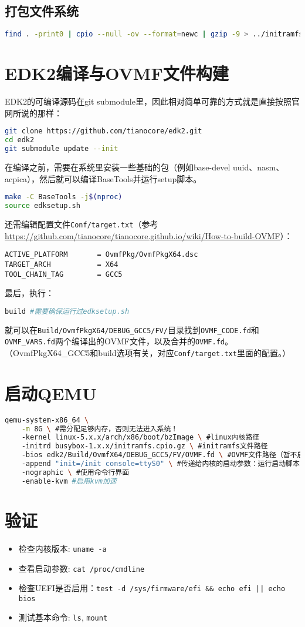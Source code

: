 \subsection{打包文件系统}
\begin{lstlisting}[language=bash]
find . -print0 | cpio --null -ov --format=newc | gzip -9 > ../initramfs.cpio.gz
\end{lstlisting}

\section{EDK2编译与OVMF文件构建}
EDK2的可编译源码在git submodule里，因此相对简单可靠的方式就是直接按照官网所说的那样：
\begin{lstlisting}[language=bash]
git clone https://github.com/tianocore/edk2.git
cd edk2
git submodule update --init
\end{lstlisting}
在编译之前，需要在系统里安装一些基础的包（例如base-devel uuid、nasm、acpica），然后就可以编译BaseTools并运行setup脚本。
\begin{lstlisting}[language=bash]
make -C BaseTools -j$(nproc)
source edksetup.sh
\end{lstlisting}
还需编辑配置文件\texttt{Conf/target.txt}（参考\url{https://github.com/tianocore/tianocore.github.io/wiki/How-to-build-OVMF}）：
\begin{lstlisting}
ACTIVE_PLATFORM       = OvmfPkg/OvmfPkgX64.dsc
TARGET_ARCH           = X64
TOOL_CHAIN_TAG        = GCC5
\end{lstlisting}
最后，执行：
\begin{lstlisting}[language=bash]
build #需要确保运行过edksetup.sh
\end{lstlisting}
就可以在\texttt{Build/OvmfPkgX64/DEBUG\_GCC5/FV/}目录找到\texttt{OVMF\_CODE.fd}和\texttt{OVMF\_VARS.fd}两个编译出的OVMF文件，以及合并的\texttt{OVMF.fd}。（OvmfPkgX64\_GCC5和build选项有关，对应\texttt{Conf/target.txt}里面的配置。）

\section{启动QEMU}
\begin{lstlisting}[language=bash]
qemu-system-x86_64 \
    -m 8G \ #需分配足够内存，否则无法进入系统！
    -kernel linux-5.x.x/arch/x86/boot/bzImage \ #linux内核路径
    -initrd busybox-1.x.x/initramfs.cpio.gz \ #initramfs文件路径
    -bios edk2/Build/OvmfX64/DEBUG_GCC5/FV/OVMF.fd \ #OVMF文件路径（暂不启用UEFI可以去掉，使用默认SeaBIOS）
    -append "init=/init console=ttyS0" \ #传递给内核的启动参数：运行启动脚本，配置控制台输出
    -nographic \ #使用命令行界面
    -enable-kvm #启用kvm加速
\end{lstlisting}

\section{验证}
\begin{itemize}
    \item 检查内核版本: \texttt{uname -a}
    \item 查看启动参数: \texttt{cat /proc/cmdline}
    \item 检查UEFI是否启用：\texttt{test -d /sys/firmware/efi \&\& echo efi || echo bios}
    \item 测试基本命令: \texttt{ls}, \texttt{mount}
\end{itemize}
